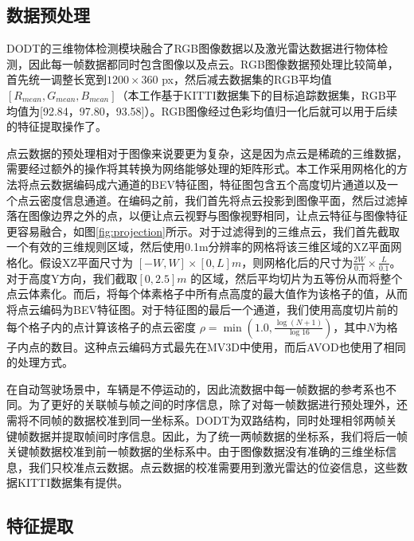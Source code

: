 \subsection{数据预处理}

DODT的三维物体检测模块融合了RGB图像数据以及激光雷达数据进行物体检测，因此每一帧数据都同时包含图像以及点云。RGB图像数据预处理比较简单，首先统一调整长宽到$1200 \times 360 $ px，然后减去数据集的RGB平均值$[R_{mean},G_{mean},B_{mean}]$（本工作基于KITTI\cite{geiger2013vision}数据集下的目标追踪数据集，RGB平均值为[92.84，97.80，93.58]）。RGB图像经过色彩均值归一化后就可以用于后续的特征提取操作了。

点云数据的预处理相对于图像来说要更为复杂，这是因为点云是稀疏的三维数据，需要经过额外的操作将其转换为网络能够处理的矩阵形式。本工作采用网格化的方法将点云数据编码成六通道的BEV特征图，特征图包含五个高度切片通道以及一个点云密度信息通道。在编码之前，我们首先将点云投影到图像平面，然后过滤掉落在图像边界之外的点，以便让点云视野与图像视野相同，让点云特征与图像特征更容易融合，如图\ref{fig:projection}所示。对于过滤得到的三维点云，我们首先截取一个有效的三维规则区域，然后使用0.1m分辨率的网格将该三维区域的XZ平面网格化。假设XZ平面尺寸为 $[-W,W] \times [0, L] m$，则网格化后的尺寸为$\frac{2W}{0.1} \times \frac{L}{0.1}$。对于高度Y方向，我们截取$[0,2.5] m$ 的区域，然后平均切片为五等份从而将整个点云体素化。而后，将每个体素格子中所有点高度的最大值作为该格子的值，从而将点云编码为BEV特征图。对于特征图的最后一个通道，我们使用高度切片前的每个格子内的点计算该格子的点云密度 $\rho = \min(1.0, \frac{\log(N+1)}{\log 16})$，其中$N$为格子内点的数目。这种点云编码方式最先在MV3D\cite{chen2017multi}中使用，而后AVOD\cite{ku2018joint}也使用了相同的处理方式。



在自动驾驶场景中，车辆是不停运动的，因此流数据中每一帧数据的参考系也不同。为了更好的关联帧与帧之间的时序信息，除了对每一帧数据进行预处理外，还需将不同帧的数据校准到同一坐标系。DODT为双路结构，同时处理相邻两帧关键帧数据并提取帧间时序信息。因此，为了统一两帧数据的坐标系，我们将后一帧关键帧数据校准到前一帧数据的坐标系中。由于图像数据没有准确的三维坐标信息，我们只校准点云数据。点云数据的校准需要用到激光雷达的位姿信息，这些数据KITTI数据集有提供。

\subsection{特征提取}



